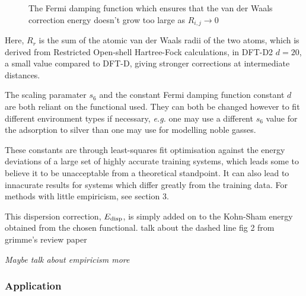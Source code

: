 \documentclass[10pt,a4paper,twocolumn,twoside]{extarticle}
\begin{document}
	\begin{figure}
		\caption{The Fermi damping function which ensures that the van der Waals correction energy doesn't grow too large as $R_{i,j} \rightarrow 0$}
		\label{fig:Fermi}
	\end{figure}
	Here, $R_r$ is the sum of the atomic van der Waals radii of the two atoms, which is derived from Restricted Open-shell Hartree-Fock calculations, in DFT-D2 $d = 20$, a small value compared to DFT-D, giving stronger corrections at intermediate distances. 

	The scaling paramater $s_6$ and the constant Fermi damping function constant $d$ are both reliant on the functional used. They can both be changed however to fit different environment types if necessary, \emph{e.g.} one may use a different $s_6$ value for the adsorption to silver\cite{Schiavo2018} than one may use for modelling noble gasses.  

	These constants are through least-squares fit optimisation against the energy deviations of a large set of highly accurate training systems, which leads some to believe it to be unacceptable from a theoretical standpoint. It can also lead to innacurate results for systems which differ greatly from the training data.\cite{Sato2009}\cite{Grimme2010}\cite{Jones2015} For methods with little empiricism, see section 3.

	This dispersion correction, $E_{\rm disp}$, is simply added on to the Kohn-Sham energy obtained from the chosen functional.
	\color{red}talk about the dashed line fig 2 from grimme's review paper \color{black}

	\emph{Maybe talk about empiricism more}
	\subsubsection{Application}
\end{document}
